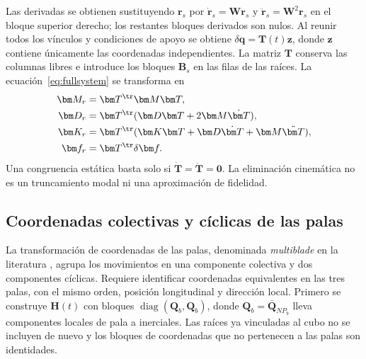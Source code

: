 

Las derivadas se obtienen sustituyendo $\bm r_s$ por $\dot{\bm r}_s=\bm W\bm r_s$ y $\ddot{\bm r}_s=\bm W^2\bm r_s$ en el bloque superior derecho; los restantes bloques derivados son nulos. Al reunir todos los vínculos y condiciones de apoyo se obtiene $\delta\bm q=\bm T(t)\bm z$, donde $\bm z$ contiene únicamente las coordenadas independientes. La matriz $\bm T$ conserva las columnas libres e introduce los bloques $\bm B_s$ en las filas de las raíces. La ecuación~\eqref{eq:fullsystem} se transforma en
\begin{align}
\bm M_r&=\bm T^\tr\bm M\bm T,\nonumber\\
\bm D_r&=\bm T^\tr(\bm D\bm T+2\bm M\dot{\bm T}),\nonumber\\
\bm K_r&=\bm T^\tr(\bm K\bm T+\bm D\dot{\bm T}+\bm M\ddot{\bm T}),\label{eq:dynamicprojection}\\
\bm f_r&=\bm T^\tr\delta\bm f.\nonumber
\end{align}
Una congruencia estática basta solo si $\dot{\bm T}=\ddot{\bm T}=\bm0$. La eliminación cinemática no es un truncamiento modal ni una aproximación de fidelidad.

\subsection{Coordenadas colectivas y cíclicas de las palas}
La transformación de coordenadas de las palas, denominada \emph{multiblade} en la literatura \citep{bir2008}, agrupa los movimientos en una componente colectiva y dos componentes cíclicas. Requiere identificar coordenadas equivalentes en las tres palas, con el mismo orden, posición longitudinal y dirección local. Primero se construye $\bm H(t)$ con bloques $\operatorname{diag}(\bm Q_b,\bm Q_b)$, donde $\bm Q_b=\overline{\bm Q}_{NP_b}$ lleva componentes locales de pala a inerciales. Las raíces ya vinculadas al cubo no se incluyen de nuevo y los bloques de coordenadas que no pertenecen a las palas son identidades.

